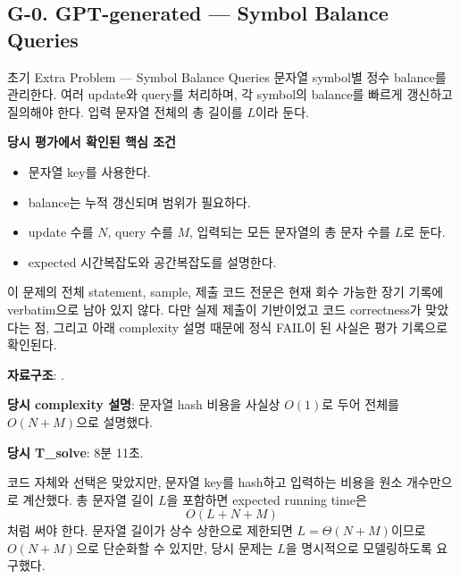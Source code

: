 \subsection{G-0. GPT-generated --- Symbol Balance Queries}
\begin{problembox}{초기 Extra Problem --- Symbol Balance Queries}
문자열 symbol별 정수 balance를 관리한다. 여러 update와 query를 처리하며, 각 symbol의 balance를 빠르게 갱신하고 질의해야 한다. 입력 문자열 전체의 총 길이를 $L$이라 둔다.

\textbf{당시 평가에서 확인된 핵심 조건}
\begin{itemize}
\item 문자열 key를 사용한다.
\item balance는 누적 갱신되며  범위가 필요하다.
\item update 수를 $N$, query 수를 $M$, 입력되는 모든 문자열의 총 문자 수를 $L$로 둔다.
\item expected 시간복잡도와 공간복잡도를 설명한다.
\end{itemize}
\end{problembox}

\begin{notebox}[세션 복원 상태]
이 문제의 전체 statement, sample, 제출 코드 전문은 현재 회수 가능한 장기 기록에 verbatim으로 남아 있지 않다. 다만 실제 제출이  기반이었고 코드 correctness가 맞았다는 점, 그리고 아래 complexity 설명 때문에 정식 FAIL이 된 사실은 평가 기록으로 확인된다.
\end{notebox}

\begin{answerbox}
\textbf{자료구조}: .

\textbf{당시 complexity 설명}: 문자열 hash 비용을 사실상 $O(1)$로 두어 전체를 $O(N+M)$으로 설명했다.

\textbf{당시 T\_solve}: 8분 11초.
\end{answerbox}

\begin{notebox}
코드 자체와  선택은 맞았지만, 문자열 key를 hash하고 입력하는 비용을 원소 개수만으로 계산했다. 총 문자열 길이 $L$을 포함하면 expected running time은
\[
O(L+N+M)
\]
처럼 써야 한다. 문자열 길이가 상수 상한으로 제한되면 $L=\Theta(N+M)$이므로 $O(N+M)$으로 단순화할 수 있지만, 당시 문제는 $L$을 명시적으로 모델링하도록 요구했다.
\end{notebox}

